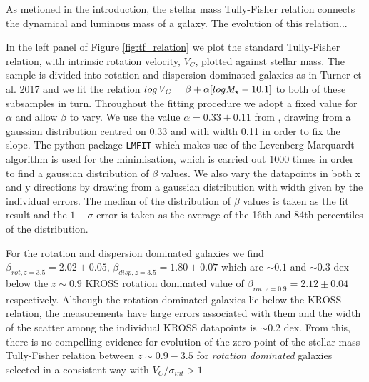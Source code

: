 \documentclass[a4paper,fleqn,usenatbib]{mn2e}
\begin{document}
As metioned in the introduction, the stellar mass Tully-Fisher relation connects the dynamical and luminous mass of a galaxy.
The evolution of this relation...

In the left panel of Figure \ref{fig:tf_relation} we plot the standard Tully-Fisher relation, with intrinsic rotation velocity, $V_{C}$, plotted against stellar mass.
The sample is divided into rotation and dispersion dominated galaxies as in Turner et al. 2017 and we fit the relation $log{\it V_{C}} = \beta + \alpha[log{\it M_{\star}} - 10.1]$ \citep[e.g.][]{Reyes2011,Harrison2017} to both of these subsamples in turn.
Throughout the fitting procedure we adopt a fixed value for $\alpha$ and allow $\beta$ to vary.
We use the value $\alpha=0.33\pm0.11$ from \cite{Harrison2017}, drawing from a gaussian distribution centred on 0.33 and with width 0.11 in order to fix the slope.
The python package {\tt LMFIT} \citep{Newville2014} which makes use of the Levenberg-Marquardt algorithm is used for the minimisation, which is carried out 1000 times in order to find a gaussian distribution of $\beta$ values.
We also vary the datapoints in both x and y directions by drawing from a gaussian distribution with width given by the individual errors. 
The median of the distribution of $\beta$ values is taken as the fit result and the $1-\sigma$ error is taken as the average of the 16th and 84th percentiles of the distribution.

For the rotation and dispersion dominated galaxies we find $\beta_{rot,z=3.5} = 2.02\pm0.05$, $\beta_{disp,z=3.5} = 1.80\pm0.07$ which are $\sim0.1$ and $\sim0.3$ dex below the $z\sim0.9$ KROSS rotation dominated value of $\beta_{rot,z=0.9} = 2.12\pm0.04$ \citep{Harrison2017} respectively.
Although the rotation dominated galaxies lie below the KROSS relation, the measurements have large errors associated with them and the width of the scatter among the individual KROSS datapoints is $\sim0.2$ dex.
From this, there is no compelling evidence for evolution of the zero-point of the stellar-mass Tully-Fisher relation between $z\sim0.9-3.5$ for {\it rotation dominated} galaxies selected in a consistent way with $V_{C}/\sigma_{int} > 1$ \\
\end{document}
